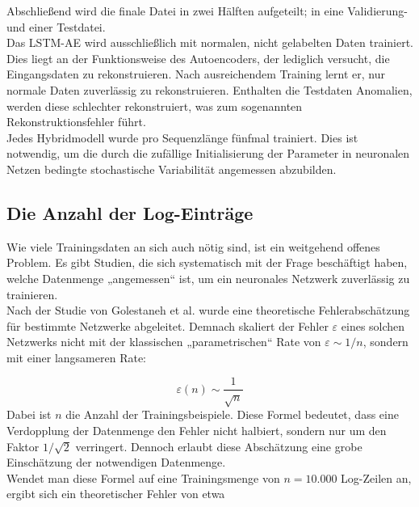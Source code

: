 \documentclass[a4paper,12pt]{article}
\begin{document}
	Abschließend wird die finale Datei in zwei Hälften aufgeteilt; in eine Validierung- und einer Testdatei.
	\\[0.5em]
	Das LSTM-AE wird ausschließlich mit normalen, nicht gelabelten Daten trainiert. Dies liegt an der Funktionsweise des Autoencoders, der lediglich versucht, die Eingangsdaten zu rekonstruieren. Nach ausreichendem Training lernt er, nur normale Daten zuverlässig zu rekonstruieren. Enthalten die Testdaten Anomalien, werden diese schlechter rekonstruiert, was zum sogenannten Rekonstruktionsfehler führt.
	\\[0.5em]
	Jedes Hybridmodell wurde pro Sequenzlänge fünfmal trainiert. Dies ist notwendig, um die durch die zufällige Initialisierung der Parameter in neuronalen Netzen bedingte stochastische Variabilität angemessen abzubilden.
	
	\subsection{Die Anzahl der Log-Einträge}
	Wie viele Trainingsdaten an sich auch nötig sind, ist ein weitgehend offenes Problem. Es gibt Studien, die sich systematisch mit der Frage beschäftigt haben, welche Datenmenge „angemessen“ ist, um ein neuronales Netzwerk zuverlässig zu trainieren. 
	\\[0.5em]
	Nach der Studie von Golestaneh et al. \cite{Golestaneh2021} wurde eine theoretische Fehlerabschätzung für bestimmte Netzwerke abgeleitet. Demnach skaliert der Fehler $\varepsilon$ eines solchen Netzwerks nicht mit der klassischen „parametrischen“ Rate von $\varepsilon \sim 1/n$, sondern mit einer langsameren Rate:
	
	\[
	\varepsilon(n) \sim \frac{1}{\sqrt{n}}
	\]
	Dabei ist \(n\) die Anzahl der Trainingsbeispiele. Diese Formel bedeutet, dass eine Verdopplung der Datenmenge den Fehler nicht halbiert, sondern nur um den Faktor \(1/\sqrt{2}\) verringert. Dennoch erlaubt diese Abschätzung eine grobe Einschätzung der notwendigen Datenmenge.
	\\[0.5em]
	Wendet man diese Formel auf eine Trainingsmenge von $n = 10.000$ Log-Zeilen an, ergibt sich ein theoretischer Fehler von etwa
	
\end{document}
